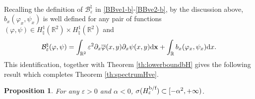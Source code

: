 \documentclass[a4paper,11pt,reqno]{amsart}
\newtheorem{proposition}[theorem]{Proposition}
\theoremstyle{definition}
\numberwithin{equation}{section}
\newcommand{\RE}{\mathbb R}
\newcommand{\BB}{\mathcal B}
\newcommand{\ve}{\varepsilon}
\renewcommand{\d}{\mathrm{d}}
\newcommand{\x}{{\bf  x}}
\newcommand{\bof}{\text{\rm b/f}}
\newcommand{\bosfer}{{\natural}}
\begin{document}
Recalling the definition of $\BB^\bosfer_{\ve}$ in \eqref{BBve1-b}-\eqref{BBve2-b}, by the discussion above, $b_x(\varphi_x,\psi_x)$ is well defined  for any pair of functions  $(\varphi,\psi) \in H_{\bosfer}^1(\RE^2)\times H_{\bosfer}^1(\RE^2)$
and 
\begin{equation}\label{directintegralB}
\BB^\bosfer_{\ve}(\varphi, \psi)= \int_{\RE^2} \ve^2 {\partial_x \overline\varphi(x,y)}\partial_x \psi(x,y) \d\x  +\int_\RE  b_x(\varphi_x,\psi_x)\d x .    
\end{equation}
This identification, together with Theorem \ref{th:lowerboundbH} gives the following result which completes Theorem \ref{th:spectrumHve}.
\begin{proposition}\label{p:spectrumHveLB}
For any $\ve>0$ and $\alpha<0$,  $\sigma(H^{\bof}_\ve)\subset [-\alpha^2,+\infty)$.
\end{proposition}
\end{document}
